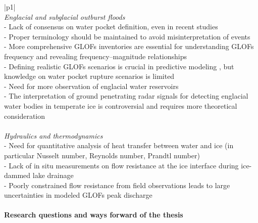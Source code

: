 \begin{longtable}{ |p{}| }
\\
\textit{Englacial and subglacial outburst floods}   \\
\hline
- Lack of consensus on water pocket definition, even in recent studies {\citep{Lutzow&al2023,Zhang&al2024}} \\
- Proper terminology should be maintained to avoid misinterpretation of events {\citep{Emmer&al2022}} \\
- More comprehensive GLOFs inventories are essential for understanding GLOFs frequency and revealing frequency–magnitude relationships {\citep{Veh&al2022,Emmer&al2022}} \\
- Defining realistic GLOFs scenarios is crucial in predictive modeling {\citep{Emmer&al2022,Zhang&al2024}}, but knowledge on water pocket rupture scenarios is limited {\citep{Haeberli1983}} \\
- Need for more observation of englacial water reservoirs {\citep{Haeberli1983}} \\
- The interpretation of ground penetrating radar signals for detecting englacial water bodies in temperate ice is controversial and requires more theoretical consideration {\citep{Murray&al2000,Brown&al2009}} \\
\\
\textit{Hydraulics and thermodynamics}\\
\hline
- Need for quantitative analysis of heat transfer between water and ice (in particular Nusselt number, Reynolds number, Prandtl number) {\citep{Clarke2003,Roberts2005,Bjornsson2010,Sommers&Rajaram2020}} \\
- Lack of in situ measurements on flow resistance at the ice interface during ice-dammed lake drainage {\citep{Clarke2003,Werder&al2010,Vincent&al2010,Kingslake&al2015,Gleason&al2016}} \\
- Poorly constrained flow resistance from field observations leads to large uncertainties in modeled GLOFs peak discharge {\citep{Werder&al2010}} \\
\\
\hline
\textbf{Research questions and ways forward of the thesis}  \\
\hline

\end{longtable}
